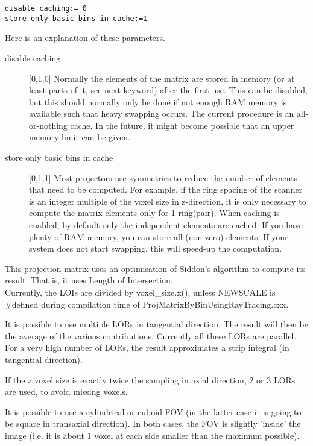 \documentclass{article}
\begin{document}
\begin{verbatim}
disable caching:= 0
store only basic bins in cache:=1
\end{verbatim}

Here is an explanation of these parameters.

\begin{description}
\item[disable caching] [0,1,0{]}
Normally the elements of the matrix are stored in memory (or 
at least parts of it, see next keyword) after the first use. 
This can be disabled, but this should normally only be done if 
not enough RAM memory is available such that heavy swapping occurs. 
The current procedure is an all-or-nothing cache. In the future, 
it might become possible that an upper memory limit can be given.


\item[store only basic bins in cache] [0,1,1{]}
Most projectors use symmetries to reduce the number of elements 
that need to be computed. For example, if the ring spacing of 
the scanner is an integer multiple of the voxel size in z-direction, 
it is only necessary to compute the matrix elements only for 
1 ring(pair). When caching is enabled, by default only the independent 
elements are cached. If you have plenty of RAM memory, you can 
store all (non-zero) elements. If your system does not start 
swapping, this will speed-up the computation.
\end{description}

{ 
}
\label{sec:projmatrixusingraytracing}
This projection matrix uses an optimisation of Siddon's algorithm 
to compute its result. That is, it uses Length of Intersection.\\
Currently, the LOIs are divided by voxel\_size.x(), unless NEWSCALE 
is \#defined during compilation time of ProjMatrixByBinUsingRayTracing.cxx. 

It is possible to use multiple LORs in tangential direction. 
The result will then be the average of the various contributions. 
Currently all these LORs are parallel. For a very high number 
of LORs, the result approximates a strip integral (in tangential 
direction).

If the z voxel size is exactly twice the sampling in axial direction, 
2 or 3 LORs are used, to avoid missing voxels. 

It is possible to use a cylindrical or cuboid FOV (in the latter 
case it is going to be square in transaxial direction). In both 
cases, the FOV is slightly 'inside' the image (i.e. it is about 
1 voxel at each side smaller than the maximum possible).
\end{document}
